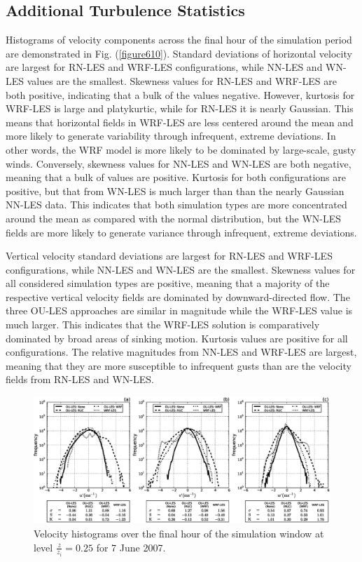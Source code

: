 \subsection{Additional Turbulence Statistics}
\label{turb-stats-625}

Histograms of velocity components across the final hour of the simulation period are demonstrated in Fig. (\autoref{figure610}). Standard deviations of horizontal velocity are largest for RN-LES and WRF-LES configurations, while NN-LES and WN-LES values are the smallest. Skewness values for RN-LES and WRF-LES are both positive, indicating that a bulk of the values negative. However, kurtosis for WRF-LES is large and platykurtic, while for RN-LES it is nearly Gaussian. This means that horizontal fields in WRF-LES are less centered around the mean and more likely to generate variability through infrequent, extreme deviations. In other words, the WRF model is more likely to be dominated by large-scale, gusty winds. Conversely, skewness values for NN-LES and WN-LES are both negative, meaning that a bulk of values are positive. Kurtosis for both configurations are positive, but that from WN-LES is much larger than than the nearly Gaussian NN-LES data. This indicates that both simulation types are more concentrated around the mean as compared with the normal distribution, but the WN-LES fields are more likely to generate variance through infrequent, extreme deviations.

Vertical velocity standard deviations are largest for RN-LES and WRF-LES configurations, while NN-LES and WN-LES are the smallest. Skewness values for all considered simulation types are positive, meaning that a majority of the respective vertical velocity fields are dominated by downward-directed flow. The three OU-LES approaches are similar in magnitude while the WRF-LES value is much larger. This indicates that the WRF-LES solution is comparatively dominated by broad areas of sinking motion. Kurtosis values are positive for all configurations. The relative magnitudes from NN-LES and WRF-LES are largest, meaning that they are more susceptible to infrequent gusts than are the velocity fields from RN-LES and WN-LES. 


\begin{figure}
\begin{center}
\includegraphics[width=\textheight]{figures/chapter6/velocity_distribution_20070607}
\end{center}
\caption{Velocity histograms over the final hour of the simulation window at level $\frac{z}{z_i}=0.25$ for 7 June 2007.}
\label{figure610}
\end{figure}



